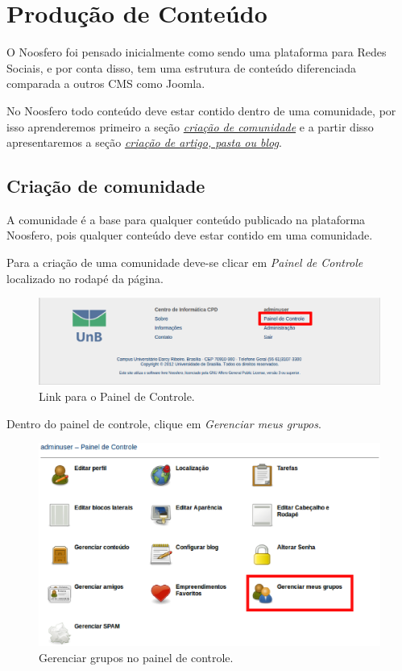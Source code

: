 \chapter{Produção de Conteúdo}
\label{chap:producaoConteudo}

O Noosfero foi pensado inicialmente como sendo uma plataforma para Redes Sociais, e por conta disso, tem uma estrutura de conteúdo diferenciada comparada a outros CMS como Joomla.

No Noosfero todo conteúdo deve estar contido dentro de uma comunidade, por isso aprenderemos primeiro a seção \emph{\hyperref[sec:criarComunidade]{criação de comunidade}} e a partir disso apresentaremos a seção \emph{\hyperref[sec:criarConteudo]{criação de artigo, pasta ou blog}}.

\section{Criação de comunidade}
\label{sec:criarComunidade}

A comunidade é a base para qualquer conteúdo publicado na plataforma Noosfero, pois qualquer conteúdo deve estar contido em uma comunidade.

Para a criação de uma comunidade deve-se clicar em \emph{Painel de Controle} localizado no rodapé da página.

\begin{figure}[H]
  \centering
    \includegraphics[keepaspectratio=true,scale=0.49]{figuras/linkPainelControle.eps}    
  \caption{Link para o Painel de Controle.}
  \label{fig:linkPainelControle}
\end{figure}

\newpage
Dentro do painel de controle, clique em \emph{Gerenciar meus grupos}.

\begin{figure}[H]
  \centering
    \includegraphics[keepaspectratio=true,scale=0.49]{figuras/painelDeControle.eps}
  \caption{Gerenciar grupos no painel de controle.}
  \label{fig:GerGrupPainelControle}
\end{figure}

